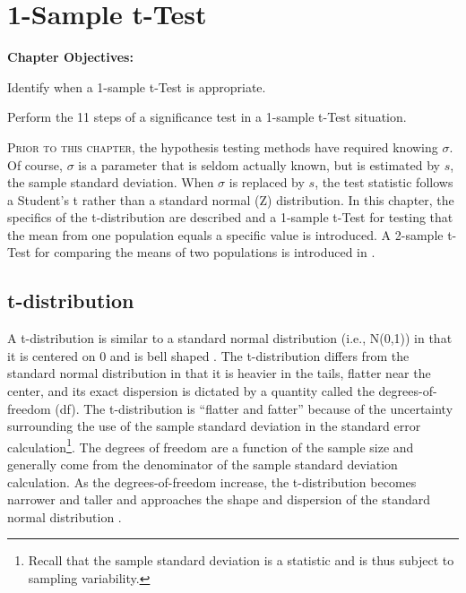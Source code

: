 \documentclass[10pt,openany]{book}\usepackage[]{graphicx}\usepackage[]{color}
\begin{document}
\chapter{1-Sample t-Test} \label{chap:tTest1}
\begin{ChapObj}{\boxwidth}
  \textbf{Chapter Objectives:}
  \begin{Enumerate}
    \item Identify when a 1-sample t-Test is appropriate.
    \item Perform the 11 steps of a significance test in a 1-sample t-Test situation.
  \end{Enumerate}
\end{ChapObj}

\minitoc
\newpage

\lettrine{P}{rior to this chapter}, the hypothesis testing methods have required knowing $\sigma$.  Of course, $\sigma$ is a parameter that is seldom actually known, but is estimated by $s$, the sample standard deviation.  When $\sigma$ is replaced by $s$, the test statistic follows a Student's t rather than a standard normal (Z) distribution.  In this chapter, the specifics of the t-distribution are described and a 1-sample t-Test for testing that the mean from one population equals a specific value is introduced. A 2-sample t-Test for comparing the means of two populations is introduced in .


\section{t-distribution}\label{sect:tDist}
A t-distribution is similar to a standard normal distribution (i.e., N(0,1)) in that it is centered on 0 and is bell shaped .  The t-distribution differs from the standard normal distribution in that it is heavier in the tails, flatter near the center, and its exact dispersion is dictated by a quantity called the degrees-of-freedom (df).  The t-distribution is ``flatter and fatter'' because of the uncertainty surrounding the use of the sample standard deviation in the standard error calculation\footnote{Recall that the sample standard deviation is a statistic and is thus subject to sampling variability.}.  The degrees of freedom are a function of the sample size and generally come from the denominator of the sample standard deviation calculation.  As the degrees-of-freedom increase, the t-distribution becomes narrower and taller and approaches the shape and dispersion of the standard normal distribution .
\end{document}

